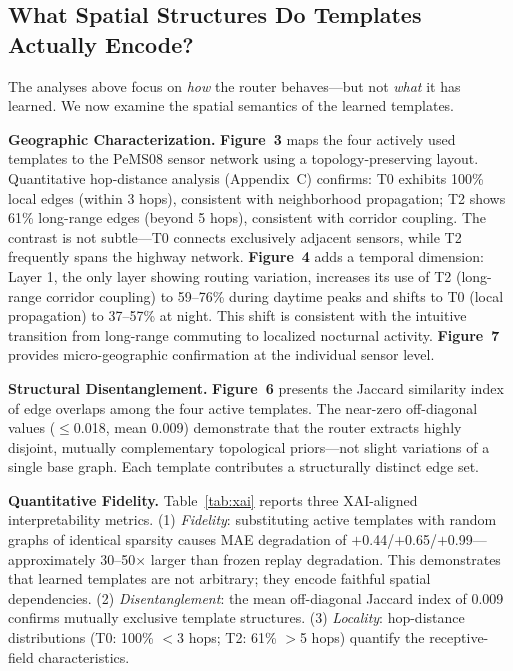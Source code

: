 \documentclass[journal]{IEEEtran}
\begin{document}
\subsection{What Spatial Structures Do Templates Actually Encode?}

The analyses above focus on \emph{how} the router behaves---but not \emph{what} it has learned. We now examine the spatial semantics of the learned templates.

\textbf{Geographic Characterization.} \textbf{Figure~3} maps the four actively used templates to the PeMS08 sensor network using a topology-preserving layout. Quantitative hop-distance analysis (Appendix~C) confirms: T0 exhibits 100\% local edges (within 3 hops), consistent with neighborhood propagation; T2 shows 61\% long-range edges (beyond 5 hops), consistent with corridor coupling. The contrast is not subtle---T0 connects exclusively adjacent sensors, while T2 frequently spans the highway network. \textbf{Figure~4} adds a temporal dimension: Layer 1, the only layer showing routing variation, increases its use of T2 (long-range corridor coupling) to 59--76\% during daytime peaks and shifts to T0 (local propagation) to 37--57\% at night. This shift is consistent with the intuitive transition from long-range commuting to localized nocturnal activity. \textbf{Figure~7} provides micro-geographic confirmation at the individual sensor level.

\textbf{Structural Disentanglement.} \textbf{Figure~6} presents the Jaccard similarity index of edge overlaps among the four active templates. The near-zero off-diagonal values ($\leq$0.018, mean 0.009) demonstrate that the router extracts highly disjoint, mutually complementary topological priors---not slight variations of a single base graph. Each template contributes a structurally distinct edge set.

\textbf{Quantitative Fidelity.} Table~\ref{tab:xai} reports three XAI-aligned interpretability metrics. (1) \emph{Fidelity}: substituting active templates with random graphs of identical sparsity causes MAE degradation of $+$0.44/$+$0.65/$+$0.99---approximately 30--50$\times$ larger than frozen replay degradation. This demonstrates that learned templates are not arbitrary; they encode faithful spatial dependencies. (2) \emph{Disentanglement}: the mean off-diagonal Jaccard index of 0.009 confirms mutually exclusive template structures. (3) \emph{Locality}: hop-distance distributions (T0: 100\% $<$3 hops; T2: 61\% $>$5 hops) quantify the receptive-field characteristics.
\end{document}
